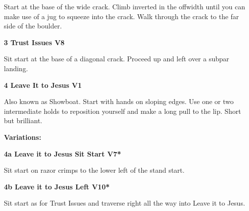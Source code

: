 \begin{multicols}{2}
\begin{minipage}{\linewidth}
					\begin{adjustwidth}{0.5cm}{}				
					Start at the base of the wide crack. Climb inverted in the offwidth until you can make use of a jug to squeeze into the crack. Walk through the crack to the far side of the boulder.
					\end{adjustwidth}
					\end{minipage}
					\begin{minipage}{\linewidth}	
					\label{rt:Trust Issues}
\colorbox{Goldenrod!50}{
\parbox{0.95\textwidth}{
\textbf{
3 Trust Issues V8  \warn \warn 
}
}
}

					\begin{adjustwidth}{0.5cm}{}				
					Sit start at the base of a diagonal crack. Proceed up and left over a subpar landing.
					\end{adjustwidth}
					\end{minipage}
					\begin{minipage}{\linewidth}	
					\label{rt:Leave It to Jesus}
\colorbox{green!20}{
\parbox{0.95\textwidth}{
\textbf{
4 Leave It to Jesus V1     
}
}
}

					\begin{adjustwidth}{0.5cm}{}				
					Also known as Showboat. Start with hands on sloping edges. Use one or two intermediate holds to reposition yourself and make a long pull to the lip. Short but brilliant.
					\end{adjustwidth}
					\end{minipage}
						\begin{adjustwidth}{0.5cm}{}				
						\textbf{Variations:} \newline
							\begin{minipage}{\linewidth}	
							\label{vr:Leave it to Jesus Sit Start}
\colorbox{Goldenrod!50}{
\parbox{0.95\textwidth}{
\textbf{
4a Leave it to Jesus Sit Start V7*  
}
}
}

							\begin{adjustwidth}{0.5cm}{}				
							Sit start on razor crimps to the lower left of the stand start.
							\end{adjustwidth}
							\end{minipage}
							\begin{minipage}{\linewidth}	
							\label{vr:Leave it to Jesus Left}
\colorbox{red!20}{
\parbox{0.95\textwidth}{
\textbf{
4b Leave it to Jesus Left V10*  
}
}
}

							\begin{adjustwidth}{0.5cm}{}				
							Sit start as for Trust Issues and traverse right all the way into Leave it to Jesus.
							\end{adjustwidth}
							\end{minipage}
						\end{adjustwidth}


\end{multicols}
